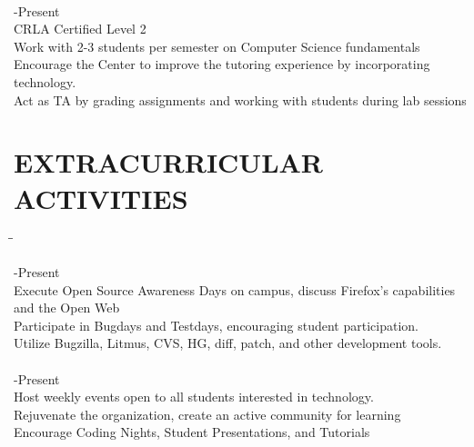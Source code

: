 \documentclass{res}
\begin{document}
\begin{resume}
\begin{tabbing}
\\

   \hspace{-0.25in}{\bf Math/Computer Science Tutor, Chapman University Center for Academic Success} \> -Present\\
	 CRLA Certified Level 2\\
	 Work with 2-3 students per semester on Computer Science fundamentals\\
	 Encourage the Center to improve the tutoring experience by incorporating technology.\\
	 Act as TA by grading assignments and working with students during lab sessions\\
	\end{tabbing}
 
\section{EXTRACURRICULAR ACTIVITIES}          
	\vspace{-5pt}
   \begin{tabbing}
   \hspace{2.5in}\= \hspace{3.45in}\= \kill %

    \hspace{-0.25in}{\bf Campus Rep, Mozilla Firefox} \> -Present\\
	 Execute Open Source Awareness Days on campus, discuss Firefox's capabilities and the Open Web \\
	 Participate in Bugdays and Testdays, encouraging student participation. \\
	 Utilize Bugzilla, Litmus, CVS, HG, diff, patch, and other development tools.\\

\\

    \hspace{-0.25in}{\bf President, Chapman University ACM} \> -Present\\
	 Host weekly events open to all students interested in technology.\\
	 Rejuvenate the organization, create an active community for learning \\
	 Encourage Coding Nights, Student Presentations, and Tutorials\\

\\


\end{tabbing}
\end{resume}
\end{document}
